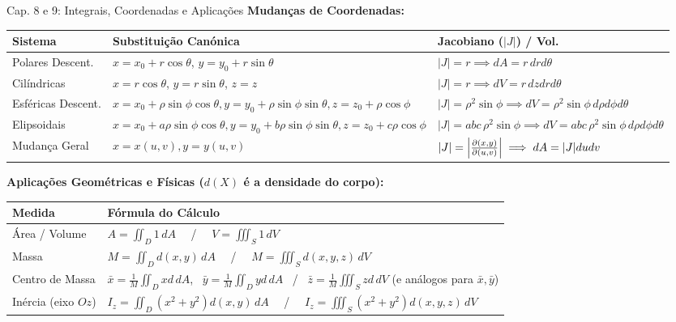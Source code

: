 \documentclass[11pt,a4paper]{article}
\begin{document}
\begin{definitionbox}[breakable, left=4pt, right=4pt, top=4pt, bottom=4pt, boxrule=0.6pt, colframe=secondaryColor]{Cap. 8 e 9: Integrais, Coordenadas e Aplicações}
  \def\arraystretch{1.2}
  \textbf{Mudanças de Coordenadas:} \par
  \vspace{2pt}
  \begin{tabular}{|p{2.3cm}|p{5.1cm}|p{9.2cm}|}
    \hline
    \textbf{Sistema} & \textbf{Substituição Canónica} & \textbf{Jacobiano ($|J|$) / Vol.} \\ \hline
    Polares Descent. & $x = x_0 + r\cos\theta$, $y = y_0 + r\sin\theta$ & $|J| = r \implies dA = r \, dr d\theta$ \\ \hline
    Cilíndricas & $x = r\cos\theta$, $y = r\sin\theta$, $z = z$ & $|J| = r \implies dV = r \, dz dr d\theta$ \\ \hline
    Esféricas Descent. & $x = x_0 + \rho\sin\phi\cos\theta, y = y_0 + \rho\sin\phi\sin\theta, z = z_0 + \rho\cos\phi$ & $|J| = \rho^2\sin\phi \implies dV = \rho^2\sin\phi \, d\rho d\phi d\theta$ \\ \hline
    Elipsoidais & $x = x_0 + a\rho\sin\phi\cos\theta, y = y_0 + b\rho\sin\phi\sin\theta, z = z_0 + c\rho\cos\phi$ & $|J| = abc\,\rho^2\sin\phi \implies dV = abc\,\rho^2\sin\phi \, d\rho d\phi d\theta$ \\ \hline
    Mudança Geral & $x=x(u,v), y=y(u,v)$ & $|J| = \left| \pdv{(x,y)}{(u,v)} \right| \implies dA = |J| du dv$ \\ \hline
  \end{tabular}

  \newpage

  \vspace{6pt}
  \textbf{Aplicações Geométricas e Físicas ($d(X)$ é a densidade do corpo):} \par
  \vspace{2pt}
  \begin{tabular}{|p{2.5cm}|p{14.1cm}|}
    \hline
    \textbf{Medida} & \textbf{Fórmula do Cálculo} \\ \hline
    Área / Volume & $A = \iint_D 1\,dA$ \ \  / \ \  $V = \iiint_S 1\,dV$ \\ \hline
    Massa & $M = \iint_D d(x,y)\,dA$ \ \  / \ \  $M = \iiint_S d(x,y,z)\,dV$ \\ \hline
    Centro de Massa & $\bar{x} = \frac{1}{M}\iint_D x d\,dA$, \ $\bar{y} = \frac{1}{M}\iint_D y d\,dA$ \  / \  $\bar{z} = \frac{1}{M}\iiint_S z d\,dV$ (e análogos para $\bar{x}, \bar{y}$) \\ \hline
    Inércia (eixo $Oz$) & $I_z = \iint_D (x^2+y^2)d(x,y)\,dA$ \ \  / \ \  $I_z = \iiint_S (x^2+y^2)d(x,y,z)\,dV$ \\ \hline
  \end{tabular}
\end{definitionbox}
\end{document}
